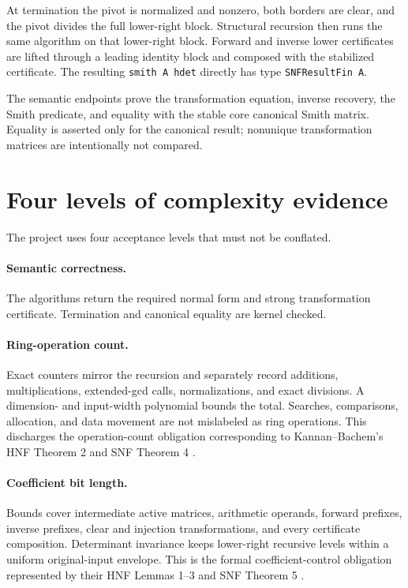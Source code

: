 \documentclass[11pt]{article}
\newcommand{\code}[1]{\texttt{#1}}
\begin{document}
At termination the pivot is normalized and nonzero, both borders are clear,
and the pivot divides the full lower-right block.  Structural recursion then
runs the same algorithm on that lower-right block.  Forward and inverse lower
certificates are lifted through a leading identity block and composed with
the stabilized certificate.  The resulting \code{smith A hdet} directly has
type \code{SNFResultFin A}.

The semantic endpoints prove the transformation equation, inverse recovery,
the Smith predicate, and equality with the stable core canonical Smith
matrix.  Equality is asserted only for the canonical result; nonunique
transformation matrices are intentionally not compared.

\section{Four levels of complexity evidence}

The project uses four acceptance levels that must not be conflated.

\paragraph{Semantic correctness.}
The algorithms return the required normal form and strong transformation
certificate.  Termination and canonical equality are kernel checked.

\paragraph{Ring-operation count.}
Exact counters mirror the recursion and separately record additions,
multiplications, extended-gcd calls, normalizations, and exact divisions.  A
dimension- and input-width polynomial bounds the total.  Searches,
comparisons, allocation, and data movement are not mislabeled as ring
operations.  This discharges the operation-count obligation corresponding to
Kannan--Bachem's HNF Theorem 2 and SNF Theorem 4
\citep[pp. 503--505]{kannanBachem1979}.

\paragraph{Coefficient bit length.}
Bounds cover intermediate active matrices, arithmetic operands, forward
prefixes, inverse prefixes, clear and injection transformations, and every
certificate composition.  Determinant invariance keeps lower-right recursive
levels within a uniform original-input envelope.  This is the formal
coefficient-control obligation represented by their HNF Lemmas 1--3 and SNF
Theorem 5 \citep[pp. 502--505]{kannanBachem1979}.
\end{document}
